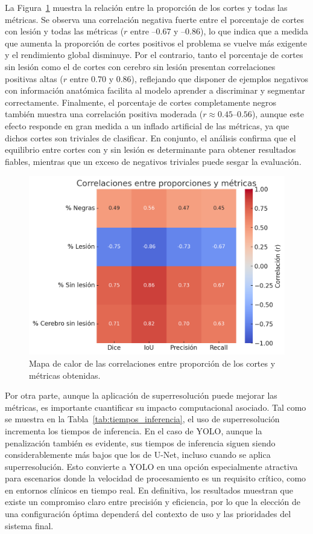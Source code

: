 \documentclass[../main.tex]{subfiles}
\begin{document}
La Figura~\ref{fig:heatmap_correlaciones} muestra la relación entre la proporción de los cortes y todas las métricas. Se observa una correlación negativa fuerte entre el porcentaje de cortes con lesión y todas las métricas ($r$ entre –0.67 y –0.86), lo que indica que a medida que aumenta la proporción de cortes positivos el problema se vuelve más exigente y el rendimiento global disminuye. Por el contrario, tanto el porcentaje de cortes sin lesión como el de cortes con cerebro sin lesión presentan correlaciones positivas altas ($r$ entre 0.70 y 0.86), reflejando que disponer de ejemplos negativos con información anatómica facilita al modelo aprender a discriminar y segmentar correctamente. Finalmente, el porcentaje de cortes completamente negros también muestra una correlación positiva moderada ($r \approx 0.45–0.56$), aunque este efecto responde en gran medida a un inflado artificial de las métricas, ya que dichos cortes son triviales de clasificar. En conjunto, el análisis confirma que el equilibrio entre cortes con y sin lesión es determinante para obtener resultados fiables, mientras que un exceso de negativos triviales puede sesgar la evaluación.

\begin{figure}
    \centering
    \includegraphics[width=0.8\linewidth]{imgs/resultados/corr/heatmap.png}
    \caption{Mapa de calor de las correlaciones entre proporción de los cortes y métricas obtenidas.}
    \label{fig:heatmap_correlaciones}
\end{figure}

Por otra parte, aunque la aplicación de superresolución puede mejorar las métricas, es importante cuantificar su impacto computacional asociado. Tal como se muestra en la Tabla~\ref{tab:tiempos_inferencia}, el uso de superresolución incrementa los tiempos de inferencia. En el caso de YOLO, aunque la penalización también es evidente, sus tiempos de inferencia siguen siendo considerablemente más bajos que los de U-Net, incluso cuando se aplica superresolución. Esto convierte a YOLO en una opción especialmente atractiva para escenarios donde la velocidad de procesamiento es un requisito crítico, como en entornos clínicos en tiempo real. En definitiva, los resultados muestran que existe un compromiso claro entre precisión y eficiencia, por lo que la elección de una configuración óptima dependerá del contexto de uso y las prioridades del sistema final.
\end{document}
